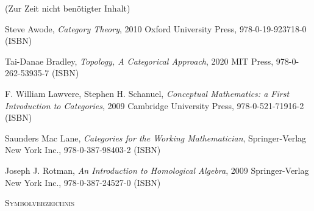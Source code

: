 \documentclass[a4paper]{amsart}
\theoremstyle{definition}
\begin{document}
\begin{backup}
    (Zur Zeit nicht benötigter Inhalt)
\end{backup}

\begin{thebibliography}{9}
      Steve Awode, \emph{Category Theory},
      2010 Oxford University Press, 978-0-19-923718-0 (ISBN)

      Tai-Danae Bradley, \emph{Topology, A Categorical Approach},
      2020 MIT Press, 978-0-262-53935-7 (ISBN)

      F. William Lawvere, Stephen H. Schanuel, \emph{Conceptual Mathematics: a First Introduction to Categories},
      2009 Cambridge University Press, 978-0-521-71916-2 (ISBN)

      Saunders Mac Lane, \emph{Categories for the Working Mathematician},
      Springer-Verlag New York Inc., 978-0-387-98403-2 (ISBN)

   	Joseph J. Rotman, \emph{An Introduction to Homological Algebra},
   	2009 Springer-Verlag New York Inc., 978-0-387-24527-0 (ISBN)

\end{thebibliography}

\begin{large}
    \centerline{\textsc{Symbolverzeichnis}}
\end{large}
\bigskip

\renewcommand*{\arraystretch}{1}
\end{document}
